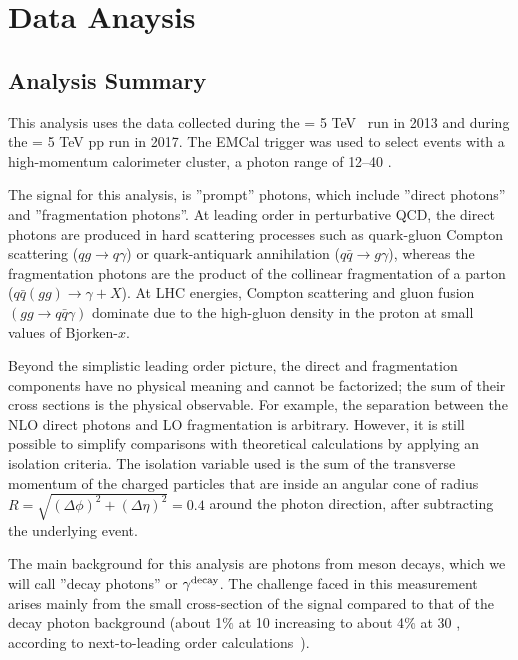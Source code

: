 \chapter{Data Anaysis}
\section{Analysis Summary}
This analysis uses the data collected during the \sqrtsNN{} = 5 TeV \pPb~run in 2013 and during the \sqrts{} = 5 TeV pp run in 2017. The EMCal trigger was used to select events with a high-momentum calorimeter cluster, a photon \pt range of {12--40 \GeVc}.%

The signal for this analysis, is ''prompt'' photons, which include ''direct photons'' and ''fragmentation photons''. At leading order in perturbative QCD, the direct photons are produced in hard scattering processes such as quark-gluon Compton scattering ($qg\to q\gamma$) or quark-antiquark annihilation ($q\bar{q}\to g\gamma$), whereas the fragmentation photons are the product of the collinear fragmentation of a parton ($q\bar{q}(gg)\to \gamma + X$). At LHC energies, Compton scattering and gluon fusion $(gg\to  q\bar{q}\gamma)$ dominate due to the high-gluon density in the proton at small values of Bjorken-$x$. 

Beyond the simplistic leading order picture, the direct and fragmentation components have no physical meaning and cannot be factorized; the sum of their cross sections is the physical observable. For example, the separation between the NLO direct photons and LO fragmentation is arbitrary. However, it is still possible to simplify comparisons with theoretical calculations by applying an isolation criteria. The isolation variable used is the sum of the transverse momentum of the charged particles that are inside an angular cone of radius $R =\sqrt{(\Delta\phi)^{2} +(\Delta\eta)^{2}  } =0.4$ around the photon direction, after subtracting the underlying event. 

The main background for this analysis are photons from meson decays, which we will call ''decay photons'' or $\gamma^\mathrm{decay}$. The  challenge faced in this measurement arises mainly from the small cross-section of the signal compared to that of the decay photon background (about 1$\%$ at {10 \GeVc} increasing to about 4$\%$ at {30 \GeVc}, according to next-to-leading order calculations~\cite{Arleo:2004gn}). 


